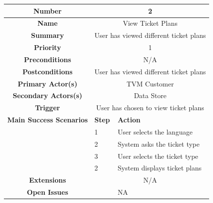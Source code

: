 \documentclass[a4paper,12pt]{report}
\begin{document}
\begin{tabular}{ | c | p{2cm} | p{7cm} |}
	
	\hline
	\textbf{Number} & \multicolumn{2}{c|}{2}  \\
	\hline
	\textbf{Name} & \multicolumn{2}{c|}{View Ticket Plans}  \\
	\hline
	\textbf{Summary} & \multicolumn{2}{c|}{User has viewed different ticket plans}  \\
	\hline
	\textbf{Priority} & \multicolumn{2}{c|}{1}  \\
	\hline
	\textbf{Preconditions} & \multicolumn{2}{c|}{N/A}  \\
	\hline
	\textbf{Postconditions} & \multicolumn{2}{c|}{User has viewed different ticket plans}  \\
	\hline
	\textbf{Primary Actor(s)} & \multicolumn{2}{c|}{TVM Customer}  \\
	\hline
	\textbf{Secondary Actors(s)} & \multicolumn{2}{c|}{Data Store}  \\
	\hline
	\textbf{Trigger} & \multicolumn{2}{c|}{User has chosen to view ticket plans}  \\
	\hline
	\textbf{Main Success Scenarios} & \textbf{Step} & \textbf{Action} \\
	\hline
	& 1 & User selects the language \\ 
	\hline
	&  2  & System asks the ticket type \\
	\hline
	&  3  & User selects the ticket type \\
	\hline
	&  2  & System displays ticket plans \\
	\hline
	\textbf{Extensions} & \multicolumn{2}{c|}{N/A}  \\
	\hline
	\textbf{Open Issues} &    & NA \\
	\hline
	
\end{tabular}
\end{document}
